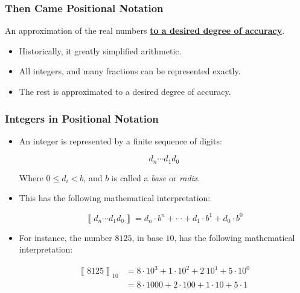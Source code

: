 \begin{frame}

\frametitle{Then Came Positional Notation}

\begin{center}

An approximation of the real numbers \textbf{\underline{to a desired degree of
accuracy}}.

\end{center}

\begin{itemize}

\item Historically, it greatly simplified arithmetic.

\item All integers, and many fractions can be represented exactly.

\item The rest is approximated to a desired degree of accuracy.

\end{itemize}

\end{frame}

\begin{frame}

\frametitle{Integers in Positional Notation}

\begin{itemize}

\item An integer is represented by a finite sequence of digits:

\[
d_n \cdots d_1 d_0
\]

Where $0 \leq d_i < b$, and $b$ is called a \emph{base} or \emph{radix}.

\item This has the following mathematical interpretation:

\[
\left\llbracket d_n \cdots d_1 d_0 \right\rrbracket =
d_n \cdot b^n + \cdots + d_1 \cdot b^1 + d_0 \cdot b^0
\]

\item For instance, the number $8125$, in base $10$, has the following
mathematical interpretation:

\begin{align*}
\left\llbracket 8125 \right\rrbracket_{10} &=
8 \cdot 10^3 + 1 \cdot 10^2 + 2^\cdot 10^1 + 5 \cdot 10^0 \\
&= 8\cdot 1000 + 2 \cdot 100 + 1 \cdot 10 + 5 \cdot 1
\end{align*}

\end{itemize}

\end{frame}

